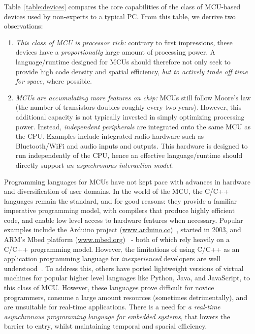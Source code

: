 Table~\ref{table:devices} compares the core capabilities of the class of MCU-based devices used by non-experts to a typical PC. From this table, we derrive two observations:

\begin{enumerate}
    \item \emph{This class of MCU is processor rich:} contrary to first impressions, these devices have a \emph{proportionally} large amount of processing power. A language/runtime designed for MCUs should therefore not only seek to provide high code density and spatial efficiency, \emph{but to actively trade off time for space}, where possible.

    \item \emph{MCUs are accumulating more features on chip:} MCUs still follow Moore's law (the number of transistors doubles roughly every two years). However, this additional capacity is not typically invested in simply optimizing processing power. Instead, \emph{independent peripherals} are integrated onto the same MCU as the CPU. Examples include integrated radio hardware such as Bluetooth/WiFi and audio inputs and outputs. This hardware is designed to run independently of the CPU, hence an effective language/runtime should directly support \emph{an asynchronous interaction model}.
\end{enumerate}

Programming languages for MCUs have not kept pace with advances in hardware and diversification of user domains. In the world of the MCU, the C/C++ languages remain the standard, and for good reasons: they provide a familiar imperative programming model, with compilers that produce highly efficient code, and enable low level access to hardware features when necessary. Popular examples include the Arduino project (\url{www.arduino.cc})~\cite{buildingArduino2014}, started in 2003, and ARM's Mbed platform (\url{www.mbed.org})~\cite{ARMmbed} - both of which rely heavily on a C/C++ programming model. However, the limitations of using C/C++ as an application programming language for \emph{inexperienced} developers are well understood~\cite{blikstein2013gears}. To address this, others have ported lightweight versions of virtual machines for popular higher level languages like Python, Java, and JavaScript, to this class of MCU. However, these languages prove difficult for novice programmers, consume a large amount resources (sometimes detrimentally), and are unsuitable for real-time applications. There is a need for \emph{a real-time asynchronous programming language for embedded systems}, that lowers the barrier to entry, whilst maintaining temporal and spacial efficiency.

